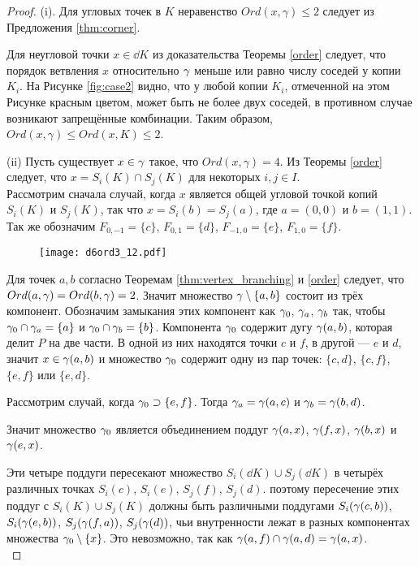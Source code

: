 \begin{proof}
(i). Для угловых точек в $K$ неравенство $Ord(x,\gamma)\leq2$ следует из Предложения \ref{thm:corner}.

Для неугловой точки $x\in\dd K$ из доказательства Теоремы \ref{order} следует, что порядок ветвления $x$ относительно $\gamma$ меньше или равно числу соседей у копии $K_i$. 
На Рисунке \ref{fig:case2} видно, что у любой копии $K_i$, отмеченной на этом Рисунке красным цветом, может быть не более двух соседей, в противном случае возникают запрещённые комбинации. 
Таким образом, $Ord(x,\gamma)\leq Ord(x,K)\leq2$.

(ii)  Пусть существует $x\in\gamma$ такое, что $Ord(x,\gamma)=4.$
Из Теоремы \ref{order} следует, что  $x=S_i(K)\cap S_j(K)$ для некоторых $i,j\in I$.\\
Рассмотрим сначала случай, когда $x$ является общей угловой точкой копий  $S_i(K)$ и $S_j(K)$, так что $x=S_i(b)=S_j(a)$, где $a=(0,0)$ и $b=(1,1)$. 
Так же обозначим $F_{0,-1}=\{c\}$, $F_{0,1}=\{d\}$, $F_{-1,0}=\{e\}$, $F_{1,0}=\{f\}$.

\begin{figure}[H]
    \centering \texttt{[image: d6ord3\_12.pdf]}
\end{figure}

Для точек $a,b$ согласно Теоремам \ref{thm:vertex_branching} и \ref{order} следует, что $Ord(a,\gamma)=Ord(b,\gamma)=2$. 
Значит множество $\gamma\setminus\{a,b\}$ состоит из трёх компонент. 
Обозначим замыкания этих компонент как $\gamma_0$, $\gamma_a$, $\gamma_b$ так, чтобы $\gamma_0\cap\gamma_a=\{a\}$ и $\gamma_0\cap \gamma_b=\{b\}$. 
Компонента $\gamma_0$ содержит дугу $\gamma(a,b)$, которая делит $P$ на две части. 
В одной из них находятся точки $c$ и $f$, в другой --- $e$ и $d$, значит $x\in \gamma(a,b)$ и множество $\gamma_0$ содержит одну из пар точек: $\{c,d\}$, $\{c,f\}$, $\{e,f\}$ или $\{e,d\}$.

Рассмотрим случай, когда $\gamma_0\supset\{e,f\}$. 
Тогда $\gamma_a=\gamma(a,c)$ и $\gamma_b=\gamma(b,d)$.

Значит множество $\gamma_0$ является объединением поддуг $\gamma(a,x)$, $\gamma(f,x)$, $\gamma(b,x)$ и $\gamma(e,x)$.

Эти четыре поддуги пересекают множество $S_i(\dd K)\cup S_j(\dd K)$ в четырёх различных точках $S_i(c)$, $S_i(e)$, $S_j(f)$, $S_j(d)$. 
поэтому пересечение этих поддуг с $S_i( K)\cup S_j(K)$ должны быть различными поддугами $S_i(\gamma(c,b))$,  $S_i(\gamma(e,b))$, $S_j(\gamma(f,a))$, $S_j(\gamma(d))$, чьи внутренности лежат в разных компонентах множества $\gamma_0\setminus\{x\}$. 
Это невозможно, так как $\gamma(a,f)\cap\gamma(a,d)=\gamma(a,x)$.\\


\end{proof}

